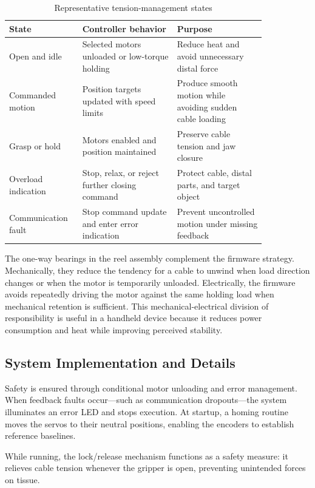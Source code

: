 \begin{table}[htbp]
    \centering
    \caption{Representative tension-management states}
    \label{tab:tension_management_states}
    \begin{tabular}{p{0.20\linewidth} p{0.33\linewidth} p{0.31\linewidth}}
        \toprule
        State & Controller behavior & Purpose \\
        \midrule
        Open and idle & Selected motors unloaded or low-torque holding & Reduce heat and avoid unnecessary distal force \\
        Commanded motion & Position targets updated with speed limits & Produce smooth motion while avoiding sudden cable loading \\
        Grasp or hold & Motors enabled and position maintained & Preserve cable tension and jaw closure \\
        Overload indication & Stop, relax, or reject further closing command & Protect cable, distal parts, and target object \\
        Communication fault & Stop command update and enter error indication & Prevent uncontrolled motion under missing feedback \\
        \bottomrule
    \end{tabular}
\end{table}

The one-way bearings in the reel assembly complement the firmware strategy. Mechanically, they reduce the tendency for a cable to unwind when load direction changes or when the motor is temporarily unloaded. Electrically, the firmware avoids repeatedly driving the motor against the same holding load when mechanical retention is sufficient. This mechanical-electrical division of responsibility is useful in a handheld device because it reduces power consumption and heat while improving perceived stability.

\subsection{System Implementation and Details}
Safety is ensured through conditional motor unloading and error management. When feedback faults occur—such as communication dropouts—the system illuminates an error LED and stops execution. At startup, a homing routine moves the servos to their neutral positions, enabling the encoders to establish reference baselines.

While running, the lock/release mechanism functions as a safety measure: it relieves cable tension whenever the gripper is open, preventing unintended forces on tissue.

